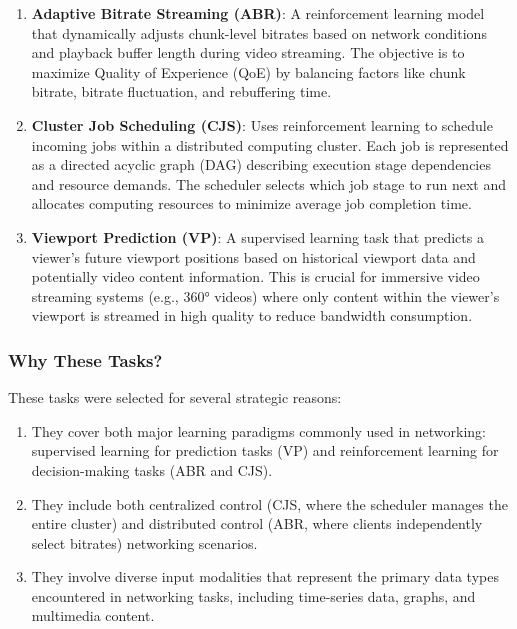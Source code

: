 \documentclass[twocolumn]{article}
\begin{document}
\begin{enumerate}[itemsep=0pt, topsep=2pt, parsep=0pt]
  \item \textbf{Adaptive Bitrate Streaming (ABR)}: A reinforcement learning model that dynamically adjusts chunk-level bitrates based on network conditions and playback buffer length during video streaming. The objective is to maximize Quality of Experience (QoE) by balancing factors like chunk bitrate, bitrate fluctuation, and rebuffering time.

  \item \textbf{Cluster Job Scheduling (CJS)}: Uses reinforcement learning to schedule incoming jobs within a distributed computing cluster. Each job is represented as a directed acyclic graph (DAG) describing execution stage dependencies and resource demands. The scheduler selects which job stage to run next and allocates computing resources to minimize average job completion time.

  \item \textbf{Viewport Prediction (VP)}: A supervised learning task that predicts a viewer's future viewport positions based on historical viewport data and potentially video content information. This is crucial for immersive video streaming systems (e.g., 360° videos) where only content within the viewer's viewport is streamed in high quality to reduce bandwidth consumption.
\end{enumerate}

\subsubsection{Why These Tasks?}
These tasks were selected for several strategic reasons:

\begin{enumerate}[itemsep=0pt, topsep=2pt, parsep=0pt]
  \item They cover both major learning paradigms commonly used in networking: supervised learning for prediction tasks (VP) and reinforcement learning for decision-making tasks (ABR and CJS).
  \item They include both centralized control (CJS, where the scheduler manages the entire cluster) and distributed control (ABR, where clients independently select bitrates) networking scenarios.
  \item They involve diverse input modalities that represent the primary data types encountered in networking tasks, including time-series data, graphs, and multimedia content.
\end{enumerate}
\end{document}

